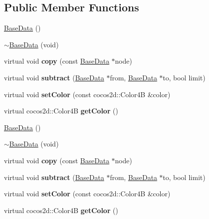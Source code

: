 \subsection*{Public Member Functions}
\begin{DoxyCompactItemize}
\item 
\hyperlink{classcocostudio_1_1BaseData_a9bced58e03cdd170ffbed4b21316a086}{Base\+Data} ()
\item 
\hyperlink{classcocostudio_1_1BaseData_af3aac984dde07301661534f494f1c290}{$\sim$\+Base\+Data} (void)
\item 
\mbox{\label{classcocostudio_1_1BaseData_a0359ce7b876b6e685dbf703682245124}} 
virtual void {\bfseries copy} (const \hyperlink{classcocostudio_1_1BaseData}{Base\+Data} $\ast$node)
\item 
\mbox{\label{classcocostudio_1_1BaseData_a491a160a8dfc26aeb8141b23c56e864b}} 
virtual void {\bfseries subtract} (\hyperlink{classcocostudio_1_1BaseData}{Base\+Data} $\ast$from, \hyperlink{classcocostudio_1_1BaseData}{Base\+Data} $\ast$to, bool limit)
\item 
\mbox{\label{classcocostudio_1_1BaseData_ae6d838aa9d04a0cc420132b83dec6bae}} 
virtual void {\bfseries set\+Color} (const cocos2d\+::\+Color4B \&color)
\item 
\mbox{\label{classcocostudio_1_1BaseData_a16d94a5ccc8245ae21ed861386d384fc}} 
virtual cocos2d\+::\+Color4B {\bfseries get\+Color} ()
\item 
\hyperlink{classcocostudio_1_1BaseData_a9bced58e03cdd170ffbed4b21316a086}{Base\+Data} ()
\item 
\hyperlink{classcocostudio_1_1BaseData_af3aac984dde07301661534f494f1c290}{$\sim$\+Base\+Data} (void)
\item 
\mbox{\label{classcocostudio_1_1BaseData_ae9f5963db7fb9f5de06d5e4959bddaf0}} 
virtual void {\bfseries copy} (const \hyperlink{classcocostudio_1_1BaseData}{Base\+Data} $\ast$node)
\item 
\mbox{\label{classcocostudio_1_1BaseData_af72a10ff90d1ad8844fb6a8085d79bde}} 
virtual void {\bfseries subtract} (\hyperlink{classcocostudio_1_1BaseData}{Base\+Data} $\ast$from, \hyperlink{classcocostudio_1_1BaseData}{Base\+Data} $\ast$to, bool limit)
\item 
\mbox{\label{classcocostudio_1_1BaseData_ae6d838aa9d04a0cc420132b83dec6bae}} 
virtual void {\bfseries set\+Color} (const cocos2d\+::\+Color4B \&color)
\item 
\mbox{\label{classcocostudio_1_1BaseData_a9b7fb51c96d8a6597c21d835e733e1f5}} 
virtual cocos2d\+::\+Color4B {\bfseries get\+Color} ()
\end{DoxyCompactItemize}
